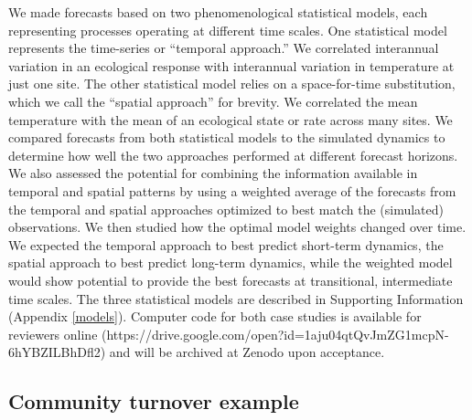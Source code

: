 \documentclass[11pt]{article}
\begin{document}
We made forecasts based on two phenomenological statistical models, each representing processes operating at different time scales. One statistical model represents the time-series or ``temporal approach.'' We correlated interannual variation in an ecological response with interannual variation in temperature at just one site. The other statistical model relies on a space-for-time substitution, which we call the ``spatial approach'' for brevity. We correlated the mean temperature with the mean of an ecological state or rate across many sites.  We compared forecasts from both statistical models to the simulated dynamics to determine how well the two approaches performed at different forecast horizons. We also assessed the potential for combining the information available in temporal and spatial patterns by using a weighted average of the forecasts from the temporal and spatial approaches optimized to best match the (simulated) observations. We then studied how the optimal model weights changed over time. We expected the temporal approach to best predict short-term dynamics, the spatial approach to best predict long-term dynamics, while the weighted model would show potential to provide the best forecasts at transitional, intermediate time scales. The three statistical models are described in Supporting Information (Appendix \ref{models}). Computer code for both case studies is available for reviewers online (https://drive.google.com/open?id=1aju04qtQvJmZG1mcpN-6hYBZILBhDfl2) and will be archived at Zenodo upon acceptance.

\subsection*{Community turnover example}
\end{document}
